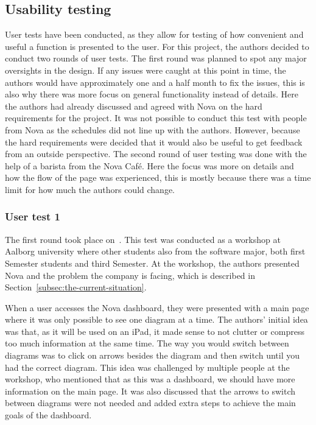 \subsection{Usability testing}\label{subsec:usability-tests}

User tests have been conducted, as they allow for testing of how convenient
and useful a function is presented to the user.
For this project, the authors decided to conduct two rounds of user tests.
The first round was planned to spot any major oversights in the design.
If any issues were caught at this point in time, the authors would have approximately one and a half month
to fix the issues, this is also why there was more focus on general functionality instead of details.
Here the authors had already discussed and agreed with Nova on the hard requirements for the project.
It was not possible to conduct this test with people from Nova as the schedules did not line up with the authors.
However, because the hard requirements were decided that it would also be useful to get feedback
from an outside perspective.
The second round of user testing was done with the help of a barista from the Nova Café.
Here the focus was more on details and how the flow of the page was experienced, this is mostly because there was
a time limit for how much the authors could change.

\subsubsection{User test 1}\label{subsubsec:user-test-1}

The first round took place on~.
This test was conducted as a workshop at Aalborg university where other students also from the software major,
both first Semester students and third Semester.
At the workshop, the authors presented Nova and the problem the company is facing, which is described in
Section~\ref{subsec:the-current-situation}.

When a user accesses the Nova dashboard, they were presented with a main page where it was only possible to see
one diagram at a time.
The authors' initial idea was that, as it will be used on an iPad, it made sense to not clutter or compress too
much information at the same time.
The way you would switch between diagrams was to click on arrows besides the diagram and then switch until you had
the correct diagram.
This idea was challenged by multiple people at the workshop, who mentioned that as this was a dashboard, we should
have more information on the main page.
It was also discussed that the arrows to switch between diagrams were not needed and added extra steps to achieve
the main goals of the dashboard.

